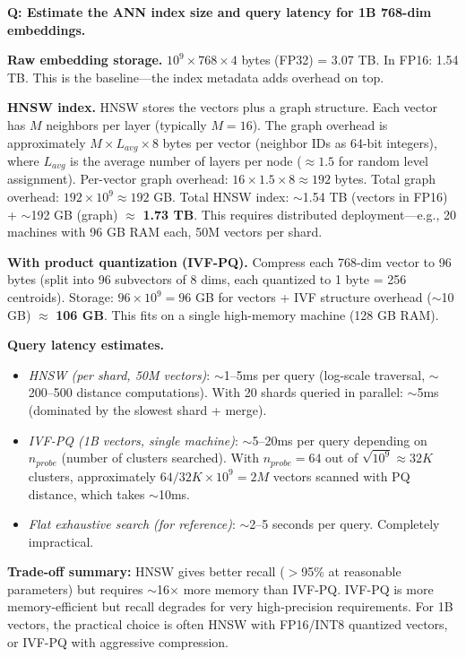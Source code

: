 \begin{interviewq}
\textbf{Q: Estimate the ANN index size and query latency for 1B 768-dim embeddings.}

 \quad {} \quad \badgefreq{\freqmed}

\stronganswer

\textbf{Raw embedding storage.} $10^9 \times 768 \times 4$ bytes (FP32) = 3.07 TB. In FP16: 1.54 TB. This is the baseline---the index metadata adds overhead on top.

\textbf{HNSW index.} HNSW stores the vectors plus a graph structure. Each vector has $M$ neighbors per layer (typically $M=16$). The graph overhead is approximately $M \times L_{avg} \times 8$ bytes per vector (neighbor IDs as 64-bit integers), where $L_{avg}$ is the average number of layers per node ($\approx 1.5$ for random level assignment). Per-vector graph overhead: $16 \times 1.5 \times 8 \approx 192$ bytes. Total graph overhead: $192 \times 10^9 \approx 192$ GB. Total HNSW index: $\sim$1.54 TB (vectors in FP16) + $\sim$192 GB (graph) $\approx$ \textbf{1.73 TB}. This requires distributed deployment---e.g., 20 machines with 96 GB RAM each, 50M vectors per shard.

\textbf{With product quantization (IVF-PQ).} Compress each 768-dim vector to 96 bytes (split into 96 subvectors of 8 dims, each quantized to 1 byte = 256 centroids). Storage: $96 \times 10^9 = 96$ GB for vectors + IVF structure overhead ($\sim$10 GB) $\approx$ \textbf{106 GB}. This fits on a single high-memory machine (128 GB RAM).

\textbf{Query latency estimates.}
\begin{itemize}
    \item \textit{HNSW (per shard, 50M vectors)}: $\sim$1--5ms per query (log-scale traversal, $\sim$200--500 distance computations). With 20 shards queried in parallel: $\sim$5ms (dominated by the slowest shard + merge).
    \item \textit{IVF-PQ (1B vectors, single machine)}: $\sim$5--20ms per query depending on $n_{probe}$ (number of clusters searched). With $n_{probe}=64$ out of $\sqrt{10^9} \approx 32K$ clusters, approximately $64/32K \times 10^9 = 2M$ vectors scanned with PQ distance, which takes $\sim$10ms.
    \item \textit{Flat exhaustive search (for reference)}: $\sim$2--5 seconds per query. Completely impractical.
\end{itemize}

\textbf{Trade-off summary:} HNSW gives better recall ($>$95\% at reasonable parameters) but requires $\sim$16$\times$ more memory than IVF-PQ. IVF-PQ is more memory-efficient but recall degrades for very high-precision requirements. For 1B vectors, the practical choice is often HNSW with FP16/INT8 quantized vectors, or IVF-PQ with aggressive compression.


\end{interviewq}

